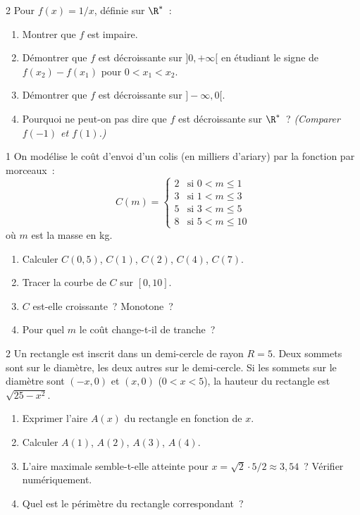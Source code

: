 \begin{probleme}[\'Etude de $f(x)=1/x$ \corrigeP]{2}
Pour $f(x)=1/x$, d\'efinie sur $\R^*$~:
\begin{enumerate}
  \item Montrer que $f$ est impaire.
  \item D\'emontrer que $f$ est d\'ecroissante sur $]0,+\infty[$
        en \'etudiant le signe de $f(x_2)-f(x_1)$ pour $0<x_1<x_2$.
  \item D\'emontrer que $f$ est d\'ecroissante sur $]-\infty,0[$.
  \item Pourquoi ne peut-on pas dire que $f$ est \og d\'ecroissante sur $\R^*$\fg~?
        \emph{(Comparer $f(-1)$ et $f(1)$.)}
\end{enumerate}
\end{probleme}

\begin{probleme}{1}
On mod\'elise le co\^ut d'envoi d'un colis (en milliers d'ariary)
par la fonction par morceaux~:
$$C(m) = \begin{cases}2 & \text{si }0<m\leq1 \\ 3 & \text{si }1<m\leq3 \\
5 & \text{si }3<m\leq5 \\ 8 & \text{si }5<m\leq10\end{cases}$$
o\`u $m$ est la masse en kg.
\begin{enumerate}
  \item Calculer $C(0{,}5)$, $C(1)$, $C(2)$, $C(4)$, $C(7)$.
  \item Tracer la courbe de $C$ sur $[0,10]$.
  \item $C$ est-elle croissante~? Monotone~?
  \item Pour quel $m$ le co\^ut change-t-il de tranche~?
\end{enumerate}
\end{probleme}

\begin{probleme}{2}
Un rectangle est inscrit dans un demi-cercle de rayon $R=5$.
Deux sommets sont sur le diam\`etre, les deux autres sur le demi-cercle.
Si les sommets sur le diam\`etre sont $(-x,0)$ et $(x,0)$
($0<x<5$), la hauteur du rectangle est $\sqrt{25-x^2}$.
\begin{enumerate}
  \item Exprimer l'aire $A(x)$ du rectangle en fonction de $x$.
  \item Calculer $A(1)$, $A(2)$, $A(3)$, $A(4)$.
  \item L'aire maximale semble-t-elle atteinte pour $x=\sqrt{2}\cdot5/2\approx3{,}54$~?
        V\'erifier num\'eriquement.
  \item Quel est le p\'erim\`etre du rectangle correspondant~?
\end{enumerate}
\end{probleme}

